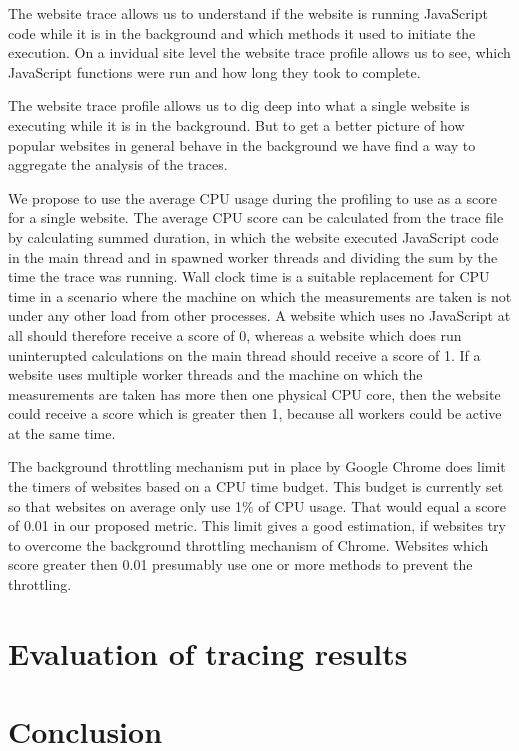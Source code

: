 \documentclass[article,type=bsc,colorback,accentcolor=tud9c]{tudthesis}
\begin{document}
  The website trace allows us to understand if the website is running JavaScript code while it is in the background and which methods it used to initiate the execution. On a invidual site level the website trace profile allows us to see, which JavaScript functions were run and how long they took to complete.

  The website trace profile allows us to dig deep into what a single website is executing while it is in the background. But to get a better picture of how popular websites in general behave in the background we have find a way to aggregate the analysis of the traces.

  We propose to use the average CPU usage during the profiling to use as a score for a single website. The average CPU score can be calculated from the trace file by calculating summed duration, in which the website executed JavaScript code in the main thread and in spawned worker threads and dividing the sum by the time the trace was running. Wall clock time is a suitable replacement for CPU time in a scenario where the machine on which the measurements are taken is not under any other load from other processes. A website which uses no JavaScript at all should therefore receive a score of 0, whereas a website which does run uninterupted calculations on the main thread should receive a score of 1. If a website uses multiple worker threads and the machine on which the measurements are taken has more then one physical CPU core, then the website could receive a score which is greater then 1, because all workers could be active at the same time.

  The background throttling mechanism put in place by Google Chrome does limit the timers of websites based on a CPU time budget. This budget is currently set so that websites on average only use 1\% of CPU usage. That would equal a score of 0.01 in our proposed metric. This limit gives a good estimation, if websites try to overcome the background throttling mechanism of Chrome. Websites which score greater then 0.01 presumably use one or more methods to prevent the throttling.

  


  
  \newpage
  \section{Evaluation of tracing results}
  
  \newpage
  \section{Conclusion}

  
  \newpage
  \printbibliography[heading=bibnumbered]

   
\end{document}
